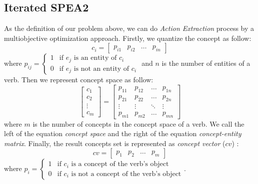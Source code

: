 \subsection{Iterated SPEA2}
\label{sec:algo_spea2}
\renewcommand{\algorithmicrequire}{ \textbf{Input:}} %
\renewcommand{\algorithmicensure}{ \textbf{Output:}} %

As the definition of our problem above, we can do \emph{Action Extraction} process by a multiobjective optimization approach.
Firstly, we quantize the concept as follow:
$$
c_i =
\left[
\begin{array}{cccc}
p_{i1} & p_{i2} & \ldots & p_{in}
\end{array}
\right]
$$
where
$
p_{ij} = \left\{ \begin{array}{ll}
1 & \textrm{if $e_j$ is an entity of $c_i$}\\
0 & \textrm{if $e_j$ is not an entity of $c_i$}
\end{array} \right.
$
and $n$ is the number of entities of a verb.
Then we represent concept space as follow:
$$
\left[
\begin{array}{c}
c_1\\
c_2\\
\vdots\\
c_m
\end{array}
\right]
=
\left[
\begin{array}{cccc}
p_{11} & p_{12} & \dots & p_{1n}\\
p_{21} & p_{22} & \dots & p_{2n}\\
\vdots & \vdots & \ddots & \vdots\\
p_{m1} & p_{m2} & \dots & p_{mn}
\end{array}
\right]
$$
where $m$ is the number of concepts in the concept space of a verb. We call the left of the equation \emph{concept space} and the right of the equation \emph{concept-entity matrix}.
Finally, the result concepts set is represented as \emph{concept vector} ($cv$) :
$$
cv
=
\left[
\begin{array}{cccc}
p_{1} & p_{2} & \ldots & p_{m}
\end{array}
\right]
$$
where
$
p_{i} = \left\{ \begin{array}{ll}
1 & \textrm{if $c_i$ is a concept of the verb's object}\\
0 & \textrm{if $c_i$ is not a concept of the verb's object}
\end{array} \right.
$.

